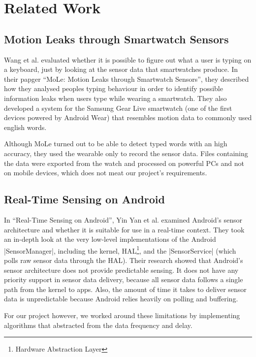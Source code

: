 \section{Related Work}
\label{sec:relatedwork}

\subsection{Motion Leaks through Smartwatch Sensors}
Wang et al. evaluated whether it is possible to figure out what a user is typing on a keyboard, just by looking at the sensor data that smartwatches produce.
In their papger ``MoLe: Motion Leaks through Smartwatch Sensors''\cite{paper:motionleaks}, they described how they analysed peoples typing behaviour in order to identify possible information leaks when users type while wearing a smartwatch.
They also developed a system for the Samsung Gear Live smartwatch (one of the first devices powered by Android Wear) that resembles motion data to commonly used english words.

Although MoLe turned out to be able to detect typed words with an high accuracy, they used the wearable only to record the sensor data.
Files containing the data were exported from the watch and processed on powerful PCs and not on mobile devices, which does not meat our project's requirements.

\subsection{Real-Time Sensing on Android}
In ``Real-Time Sensing on Android''\cite{paper:realtimesensing}, Yin Yan et al. examined Android’s sensor architecture and whether it is suitable for use in a real-time context.
They took an in-depth look at the very low-level implementations of the Android |SensorManager|\cite{androiddocs:sensormanager}, including the kernel, HAL\footnote{Hardware Abstraction Layer}, and the |SensorService| (which polls raw sensor data through the HAL).
Their research showed that Android's sensor architecture does not provide predictable sensing.
It does not have any priority support in sensor data delivery, because all sensor data follows a single path from the kernel to apps.
Also, the amount of time it takes to deliver sensor data is unpredictable because Android relies heavily on polling and buffering.

For our project however, we worked around these limitations by implementing algorithms that abstracted from the data frequency and delay.

